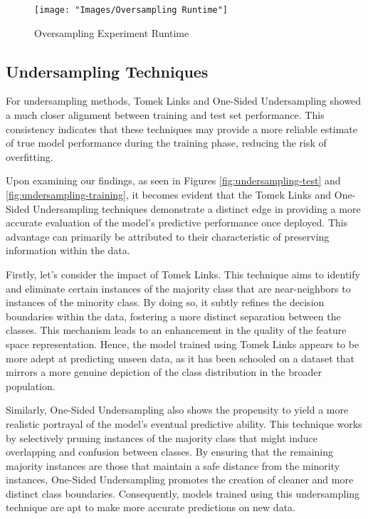 \documentclass[journal]{IEEEtran}
\begin{document}
\begin{figure}
	\centering
	\texttt{[image: "Images/Oversampling Runtime"]}
	\caption{Oversampling Experiment Runtime}
	\label{fig:oversampling-runtime}
\end{figure}
	
	\subsection{Undersampling Techniques}
	
	For undersampling methods, Tomek Links and One-Sided Undersampling showed a much closer alignment between training and test set performance. This consistency indicates that these techniques may provide a more reliable estimate of true model performance during the training phase, reducing the risk of overfitting.
	
	Upon examining our findings, as seen in Figures \ref{fig:undersampling-test} and \ref{fig:undersampling-training}, it becomes evident that the Tomek Links and One-Sided Undersampling techniques demonstrate a distinct edge in providing a more accurate evaluation of the model's predictive performance once deployed. This advantage can primarily be attributed to their characteristic of preserving information within the data.
	
	Firstly, let's consider the impact of Tomek Links. This technique aims to identify and eliminate certain instances of the majority class that are near-neighbors to instances of the minority class. By doing so, it subtly refines the decision boundaries within the data, fostering a more distinct separation between the classes. This mechanism leads to an enhancement in the quality of the feature space representation. Hence, the model trained using Tomek Links appears to be more adept at predicting unseen data, as it has been schooled on a dataset that mirrors a more genuine depiction of the class distribution in the broader population.
	
	Similarly, One-Sided Undersampling also shows the propensity to yield a more realistic portrayal of the model's eventual predictive ability. This technique works by selectively pruning instances of the majority class that might induce overlapping and confusion between classes. By ensuring that the remaining majority instances are those that maintain a safe distance from the minority instances, One-Sided Undersampling promotes the creation of cleaner and more distinct class boundaries. Consequently, models trained using this undersampling technique are apt to make more accurate predictions on new data.
	
\end{document}
